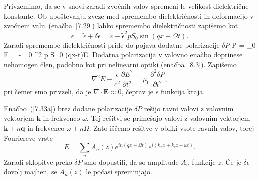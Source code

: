 Privzemimo, da se v snovi zaradi zvočnih valov spremeni le velikost
dielektrične konstante. Ob upoštevanju zveze med spremembo dielektričnosti in deformacijo
v zvočnem valu~(enačba~\ref{7.29}) lahko spremembo dielektričnosti
zapišemo kot  
\begin{equation}
\epsilon=\tilde{\epsilon}+\delta\epsilon = 
\tilde{\varepsilon} -\tilde{\epsilon}^{2}pS_{0}\sin(qx-\Omega t).
\label{7.33}
\end{equation}
Zaradi spremembe dielektričnosti pride do pojava
dodatne polarizacije $\delta P$
\beq
\delta P = \varepsilon_0 \delta \varepsilon E = - \varepsilon_0 
\tilde{\varepsilon}^2 p S_0 \sin(qx-\Omega t)E.
\eeq
Dodatna polarizacija v valovno enačbo doprinese nehomogen člen, podobno
kot pri nelinearni optiki (enačba~\ref{8.3}). Zapišemo
\begin{equation}
\nabla^{2}E-\frac{\tilde{\epsilon}}{c^{2}}{\frac{\partial E^{2}}
{\partial t^{2}}}=\mu_{0}{\frac{\partial^2 \delta P}{\partial t^{2}}},
\label{7.33a}
\end{equation}
pri čemer smo privzeli, da je $\nabla\cdot\mathbf{E}\approx 0$, čeprav je
$\epsilon$ funkcija kraja. 

Enačbo~(\ref{7.33a}) brez dodane polarizacije $\delta P$ rešijo ravni valovi 
z valovnim vektorjem $\mathbf{k}$ in frekvenco $\omega$. Tej rešitvi se 
primešajo valovi z valovnim vektorjem $\mathbf{k}\pm n\mathbf{q}$
in frekvenco $\omega\pm n\Omega$. Zato iščemo rešitve v obliki vsote
ravnih valov, torej Fouriereve vrste
\begin{equation}
E=\sum_{n}A_{n}(z)e^{in(qx-\Omega t)}e^{i(k_{x}x+k_{z}z-\omega t)}.
\label{7.34}
\end{equation}
Zaradi sklopitve preko $\delta P$ smo dopustili, da so amplitude
$A_{n}$ funkcije $z$. Če je $\delta\epsilon$ dovolj majhen, se $A_{n}(z)$
le počasi spreminjajo.

